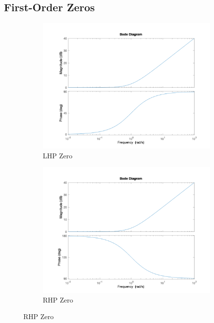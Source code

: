 \subsection*{First-Order Zeros}
\begin{figure}[!h]
  \centering
  \begin{subfigure}[b]{0.45\textwidth}	
	\includegraphics[width=\textwidth]{Images/bode_lhp_zero}
	\caption{LHP Zero}
	\label{fig:bode-lhp-zero}
  \end{subfigure}
  \begin{subfigure}[b]{0.45\textwidth}	
	\includegraphics[width=\textwidth]{Images/bode_rhp_zero}
	\caption{RHP Zero}
	\label{fig:bode-rhp-zero}
  \end{subfigure}
\end{figure}
